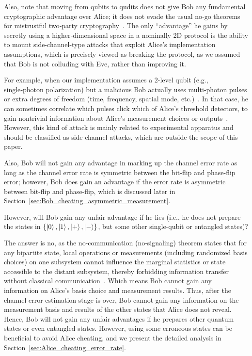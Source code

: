 \documentclass[%
 reprint,
superscriptaddress,
 amsmath,amssymb,
 aps,
]{revtex4-2}
\begin{document}
Also, note that moving from qubits to qudits does not give Bob any fundamental cryptographic advantage over Alice; it does not evade the usual no‑go theorems for mistrustful two‑party cryptography~\cite{Multiphoton_side_channel_attack1, Multiphoton_side_channel_attack2}. The only ``advantage'' he gains by secretly using a higher‑dimensional space in a nominally 2D protocol is the ability to mount side-channel-type attacks that exploit Alice’s implementation assumptions, which is precisely viewed as breaking the protocol, as we assumed that Bob is not colluding with Eve, rather than improving it.

For example, when our implementation assumes a 2-level qubit (e.g., single‑photon polarization) but a malicious Bob actually uses multi‑photon pulses or extra degrees of freedom (time, frequency, spatial mode, etc.)~\cite{Multiphoton_side_channel_attack1}. In that case, he can sometimes correlate which pulses click which of Alice’s threshold detectors, to gain nontrivial information about Alice’s measurement choices or outputs~\cite{Multiphoton_side_channel_attack1}. However, this kind of attack is mainly related to experimental apparatus and should be classified as side-channel attacks, which are outside the scope of this paper.

Also, Bob will not gain any advantage in marking up the channel error rate as long as the channel error rate is symmetric between the bit-flip and phase-flip error; however, Bob does gain an advantage if the error rate is asymmetric between bit-flip and phase-flip, which is discussed later in Section~\ref{sec:Bob_cheating_asymmetric_measurement}.

However, will Bob gain any unfair advantage if he lies (i.e., he does not prepare the states in $\{\ket{0}, \ket{1}, \ket{+}, \ket{-}\}$, but some other single-qubit or entangled states)?

The answer is no, as the no-communication (no-signaling) theorem states that for any bipartite state, local operations or measurements (including randomized basis choices) on one subsystem cannot influence the marginal statistics or state accessible to the distant subsystem, thereby forbidding information transfer without classical communication~\cite{No_signaling1, No_signaling2}. Which means Bob cannot gain any information on Alice's basis choice and measurement results. Thus, after the channel error estimation stage is over, Bob cannot gain any information on the measurement basis and results of the other states that Alice does not reveal. Hence, Bob will not gain any unfair advantages if he prepares other quantum states or even entangled states. However, using some erroneous states can be beneficial to avoid Alice cheating, and we present the detailed analysis in Section~\ref{sec:Alice_cheating_error_rate}.
\end{document}
